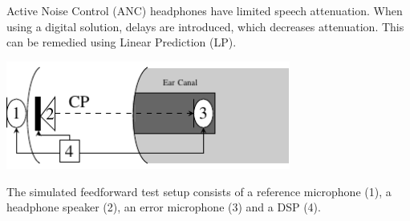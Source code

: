 \large

%
%
%
%
%
%







Active Noise Control (ANC) headphones have limited speech attenuation.
When using a digital solution, delays are introduced, which decreases attenuation. This can be remedied using Linear Prediction (LP).
\vspace{-7mm}
\begin{center}
	\includegraphics[width=0.7\textwidth]{figures/BasicOverviewZoomed.pdf}
\end{center}
\vspace{-2mm}
The simulated feedforward test setup consists of a reference microphone (1), a headphone speaker (2), an error microphone (3) and a DSP (4).



 











